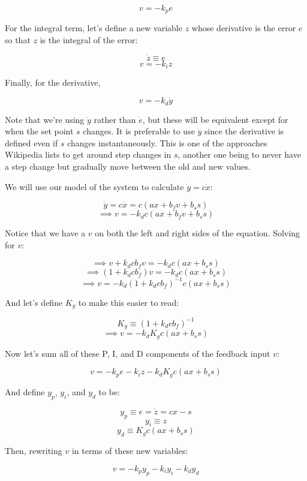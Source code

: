 \documentclass[10pt,letterpaper]{article}
\begin{document}
\[ v = -k_p e \]

For the integral term, let's define a new variable $z$ whose derivative is the error $e$ so that $z$ is the integral of the error:

\[ \dot{z} \equiv e \]
\[ v = -k_i z \]

Finally, for the derivative,

\[ v = -k_d \dot{y} \]

Note that we're using $\dot{y}$ rather than $\dot{e}$, but these will be equivalent except for when the set point $s$ changes. It is preferable to use $\dot{y}$ since the derivative is defined even if $s$ changes instantaneously. This is one of the approaches Wikipedia lists to get around step changes in $s$, another one being to never have a step change but gradually move between the old and new values.

We will use our model of the system to calculate $\dot{y} = c \dot{x}$:

\[ \dot{y} = c \dot{x} = c (ax + b_f v + b_s s) \]
\[ \implies v = -k_d c (ax + b_f v + b_s s) \]

Notice that we have a $v$ on both the left and right sides of the equation. Solving for $v$:

\[ \implies v + k_d c b_f v = -k_d c (ax + b_s s) \]
\[ \implies ( 1 + k_d c b_f ) v = -k_d c (ax + b_s s) \]
\[ \implies v = - k_d ( 1 + k_d c b_f )^{-1} c (ax + b_s s) \]

And let's define $K_g$ to make this easier to read:

\[ K_g \equiv ( 1 + k_d c b_f )^{-1} \]
\[ \implies v = - k_d K_g c (ax + b_s s) \]

Now let's sum all of these P, I, and D components of the feedback input $v$:

\[ v = -k_p e -k_i z - k_d K_g c (ax + b_s s) \]

And define $y_p$, $y_i$, and $y_d$ to be:

\begin{equation} \label{eq:y_p}
y_p \equiv e = \dot{z} = cx - s
\end{equation}
\begin{equation} \label{eq:y_i}
y_i \equiv z
\end{equation}
\begin{equation} \label{eq:y_d}
y_d \equiv K_g c (ax + b_s s)
\end{equation}

Then, rewriting $v$ in terms of these new variables:

\begin{equation} \label{eq:v}
v = -k_p y_p -k_i y_i - k_d y_d
\end{equation}
\end{document}
